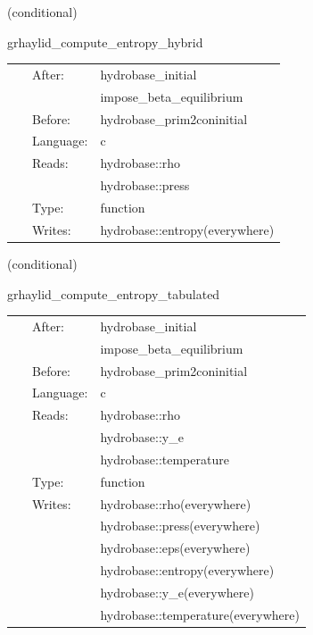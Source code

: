 \documentclass{article}
\begin{document}
\vspace{5mm}

   (conditional) 

\hspace{5mm} grhaylid\_compute\_entropy\_hybrid 

\hspace{5mm}{\it computes entropy from density and pressure using simple/hybrid native proxy } 


\hspace{5mm}

 \begin{tabular*}{160mm}{cll} 
~ & After:  & hydrobase\_initial \\ 
~& ~ &impose\_beta\_equilibrium\\ 
~ & Before:  & hydrobase\_prim2coninitial \\ 
~ & Language:  & c \\ 
~ & Reads:  & hydrobase::rho \\ 
~& ~ &hydrobase::press\\ 
~ & Type:  & function \\ 
~ & Writes:  & hydrobase::entropy(everywhere) \\ 
\end{tabular*} 


\vspace{5mm}

   (conditional) 

\hspace{5mm} grhaylid\_compute\_entropy\_tabulated 

\hspace{5mm}{\it computes entropy from density, y\_e, and temperature using tabulated eos } 


\hspace{5mm}

 \begin{tabular*}{160mm}{cll} 
~ & After:  & hydrobase\_initial \\ 
~& ~ &impose\_beta\_equilibrium\\ 
~ & Before:  & hydrobase\_prim2coninitial \\ 
~ & Language:  & c \\ 
~ & Reads:  & hydrobase::rho \\ 
~& ~ &hydrobase::y\_e\\ 
~& ~ &hydrobase::temperature\\ 
~ & Type:  & function \\ 
~ & Writes:  & hydrobase::rho(everywhere) \\ 
~& ~ &hydrobase::press(everywhere)\\ 
~& ~ &hydrobase::eps(everywhere)\\ 
~& ~ &hydrobase::entropy(everywhere)\\ 
~& ~ &hydrobase::y\_e(everywhere)\\ 
~& ~ &hydrobase::temperature(everywhere)\\ 
\end{tabular*} 
\end{document}
